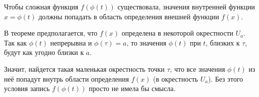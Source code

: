\begin{tcolorbox}[title=Пояснение про области определения]
	Чтобы сложная функция $f(\phi(t))$ существовала, значения внутренней функции $x = \phi(t)$ должны попадать в область определения внешней функции $f(x)$.
	
	В теореме предполагается, что $f(x)$ определена в некоторой окрестности $U_a$.
	Так как $\phi(t)$ непрерывна и $\phi(\tau) = a$, то значения $\phi(t)$ при $t$, близких к $\tau$, будут как угодно близки к $a$.
	
	Значит, найдется такая маленькая окрестность точки $\tau$, что все значения $\phi(t)$ из неё попадут внутрь области определения $f(x)$ (в окрестность $U_a$).
	Без этого условия запись $f(\phi(t))$ просто не имела бы смысла.
\end{tcolorbox}
